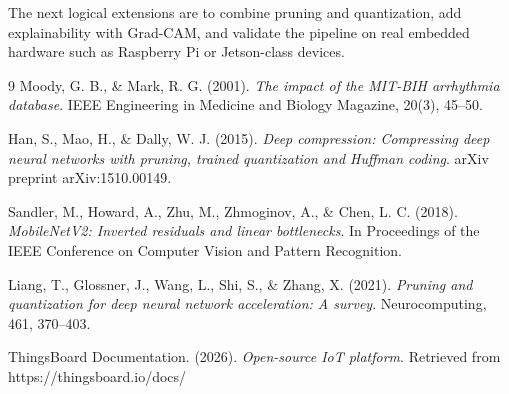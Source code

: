 \documentclass[12pt, a4paper]{article}
\begin{document}
The next logical extensions are to combine pruning and quantization, add explainability with Grad-CAM, and validate the pipeline on real embedded hardware such as Raspberry Pi or Jetson-class devices.

\begin{thebibliography}{9}
Moody, G. B., \& Mark, R. G. (2001).
\textit{The impact of the MIT-BIH arrhythmia database}.
IEEE Engineering in Medicine and Biology Magazine, 20(3), 45–50.

Han, S., Mao, H., \& Dally, W. J. (2015).
\textit{Deep compression: Compressing deep neural networks with pruning, trained quantization and Huffman coding}.
arXiv preprint arXiv:1510.00149.

Sandler, M., Howard, A., Zhu, M., Zhmoginov, A., \& Chen, L. C. (2018).
\textit{MobileNetV2: Inverted residuals and linear bottlenecks}.
In Proceedings of the IEEE Conference on Computer Vision and Pattern Recognition.

Liang, T., Glossner, J., Wang, L., Shi, S., \& Zhang, X. (2021).
\textit{Pruning and quantization for deep neural network acceleration: A survey}.
Neurocomputing, 461, 370--403.

ThingsBoard Documentation. (2026).
\textit{Open-source IoT platform}.
Retrieved from https://thingsboard.io/docs/
\end{thebibliography}
\end{document}
